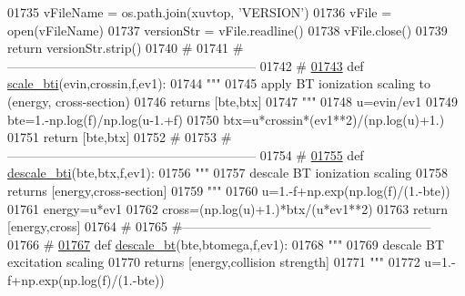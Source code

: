 \begin{DoxyCode}
{{{{{{{{{{{{{{{01735     vFileName = os.path.join(xuvtop, \textcolor{stringliteral}{'VERSION'})
01736     vFile = open(vFileName)
01737     versionStr = vFile.readline()
01738     vFile.close()
01739     \textcolor{keywordflow}{return} versionStr.strip()
01740     \textcolor{comment}{#}
01741     \textcolor{comment}{#-----------------------------------------------------------}
01742     \textcolor{comment}{#}
\hypertarget{__chianti__tools_8py_source_l01743}{}\hyperlink{namespacepyneb_1_1utils_1_1__chianti__tools_a71b9295157832135424ea7dc0138fcd4}{01743} \textcolor{keyword}{def }\hyperlink{namespacepyneb_1_1utils_1_1__chianti__tools_a71b9295157832135424ea7dc0138fcd4}{scale\_bti}(evin,crossin,f,ev1):
01744     \textcolor{stringliteral}{"""}
01745 \textcolor{stringliteral}{    apply BT ionization scaling to (energy, cross-section)}
01746 \textcolor{stringliteral}{    returns [bte,btx]}
01747 \textcolor{stringliteral}{    """}
01748     u=evin/ev1
01749     bte=1.-np.log(f)/np.log(u-1.+f)
01750     btx=u*crossin*(ev1**2)/(np.log(u)+1.)
01751     \textcolor{keywordflow}{return} [bte,btx]
01752     \textcolor{comment}{#}
01753     \textcolor{comment}{#-----------------------------------------------------------}
01754     \textcolor{comment}{#}
\hypertarget{__chianti__tools_8py_source_l01755}{}\hyperlink{namespacepyneb_1_1utils_1_1__chianti__tools_a47075ba90f01cbd7a3dbd08115544214}{01755} \textcolor{keyword}{def }\hyperlink{namespacepyneb_1_1utils_1_1__chianti__tools_a47075ba90f01cbd7a3dbd08115544214}{descale\_bti}(bte,btx,f,ev1):
01756     \textcolor{stringliteral}{"""}
01757 \textcolor{stringliteral}{    descale BT ionization scaling}
01758 \textcolor{stringliteral}{    returns [energy,cross-section]}
01759 \textcolor{stringliteral}{    """}
01760     u=1.-f+np.exp(np.log(f)/(1.-bte))
01761     energy=u*ev1
01762     cross=(np.log(u)+1.)*btx/(u*ev1**2)
01763     \textcolor{keywordflow}{return} [energy,cross]
01764     \textcolor{comment}{#}
01765     \textcolor{comment}{#-----------------------------------------------------------}
01766     \textcolor{comment}{#}
\hypertarget{__chianti__tools_8py_source_l01767}{}\hyperlink{namespacepyneb_1_1utils_1_1__chianti__tools_ad34ed06dfc613c2f1ace88fab4ac4392}{01767} \textcolor{keyword}{def }\hyperlink{namespacepyneb_1_1utils_1_1__chianti__tools_ad34ed06dfc613c2f1ace88fab4ac4392}{descale\_bt}(bte,btomega,f,ev1):
01768     \textcolor{stringliteral}{"""}
01769 \textcolor{stringliteral}{    descale BT excitation scaling}
01770 \textcolor{stringliteral}{    returns [energy,collision strength]}
01771 \textcolor{stringliteral}{    """}
01772     u=1.-f+np.exp(np.log(f)/(1.-bte))
}}}}}}}}}}}}}}}
\end{DoxyCode}
